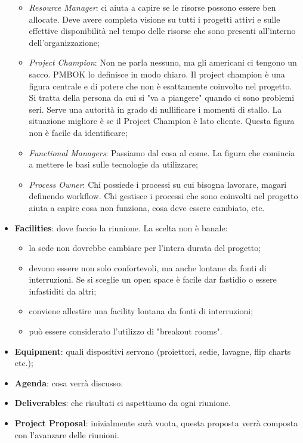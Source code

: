 \begin{itemize}
\begin{itemize}
		\item \textit{Resource Manager}: ci aiuta a capire se le risorse possono essere ben allocate. Deve avere completa visione su tutti i progetti attivi e sulle effettive disponibilità nel tempo delle risorse che sono presenti all'interno dell'organizzazione;
		\item \textit{Project Champion}: Non ne parla nessuno, ma gli americani ci tengono un sacco. PMBOK lo definisce in modo chiaro. Il project champion è una figura centrale e di potere che non è esattamente coinvolto nel progetto. Si tratta della persona da cui si "va a piangere" quando ci sono problemi seri. Serve una autorità in grado di nullificare i momenti di stallo. La situazione migliore è se il Project Champion è lato cliente. Questa figura non è facile da identificare;
		\item \textit{Functional Managers}: Passiamo dal cosa al come. La figura che comincia a mettere le basi sulle tecnologie da utilizzare;
		\item \textit{Process Owner}: Chi possiede i processi su cui bisogna lavorare, magari definendo workflow. Chi gestisce i processi che sono coinvolti nel progetto aiuta a capire cosa non funziona, cosa deve essere cambiato, etc.
	\end{itemize}
	\item \textbf{Facilities}: dove faccio la riunione. La scelta non è banale:
	\begin{itemize}
		\item la sede non dovrebbe cambiare per l'intera durata del progetto;
		\item devono essere non solo confortevoli, ma anche lontane da fonti di interruzioni. Se si sceglie un open space è facile dar fastidio o essere infastiditi da altri;
		\item conviene allestire una facility lontana da fonti di interruzioni;
		\item può essere considerato l'utilizzo di "breakout rooms".
	\end{itemize}
	\item \textbf{Equipment}: quali dispositivi servono (proiettori, sedie, lavagne, flip charts etc.);
	\item \textbf{Agenda}: cosa verrà discusso.
	\item \textbf{Deliverables}: che risultati ci aspettiamo da ogni riunione.
	\item \textbf{Project Proposal}: inizialmente sarà vuota, questa proposta verrà composta con l'avanzare delle riunioni.
\end{itemize}
